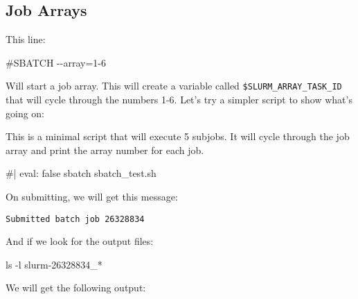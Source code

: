\documentclass[
  letterpaper,
  DIV=11,
  numbers=noendperiod]{scrreprt}
\newenvironment{Shaded}{\begin{snugshade}}{\end{snugshade}}
\newcommand{\AttributeTok}[1]{\textcolor[rgb]{0.40,0.45,0.13}{#1}}
\newcommand{\BuiltInTok}[1]{\textcolor[rgb]{0.00,0.23,0.31}{#1}}
\newcommand{\CommentTok}[1]{\textcolor[rgb]{0.37,0.37,0.37}{#1}}
\newcommand{\ExtensionTok}[1]{\textcolor[rgb]{0.00,0.23,0.31}{#1}}
\newcommand{\FunctionTok}[1]{\textcolor[rgb]{0.28,0.35,0.67}{#1}}
\newcommand{\NormalTok}[1]{\textcolor[rgb]{0.00,0.23,0.31}{#1}}
\newcommand{\PreprocessorTok}[1]{\textcolor[rgb]{0.68,0.00,0.00}{#1}}
\newcommand{\StringTok}[1]{\textcolor[rgb]{0.13,0.47,0.30}{#1}}
\newcommand{\VariableTok}[1]{\textcolor[rgb]{0.07,0.07,0.07}{#1}}
\begin{document}
\subsection{Job Arrays}\label{job-arrays}

This line:

\begin{Shaded}
\begin{Highlighting}[]
\CommentTok{\#SBATCH {-}{-}array=1{-}6 }
\end{Highlighting}
\end{Shaded}

Will start a job array. This will create a variable called
\texttt{\$SLURM\_ARRAY\_TASK\_ID} that will cycle through the numbers
1-6. Let's try a simpler script to show what's going on:

\begin{Shaded}
\end{Shaded}

This is a minimal script that will execute 5 subjobs. It will cycle
through the job array and print the array number for each job.

\begin{Shaded}
\begin{Highlighting}[]
\CommentTok{\#| eval: false}
\ExtensionTok{sbatch}\NormalTok{ sbatch\_test.sh}
\end{Highlighting}
\end{Shaded}

On submitting, we will get this message:

\begin{verbatim}
Submitted batch job 26328834
\end{verbatim}

And if we look for the output files:

\begin{Shaded}
\begin{Highlighting}[]
\FunctionTok{ls} \AttributeTok{{-}l}\NormalTok{ slurm{-}26328834\_}\PreprocessorTok{*}
\end{Highlighting}
\end{Shaded}

We will get the following output:
\end{document}
